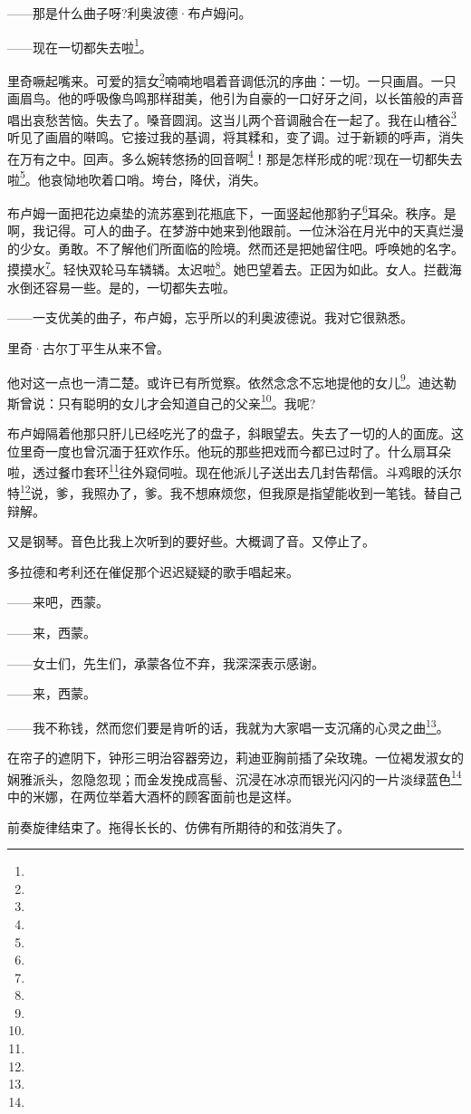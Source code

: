 \par ——那是什么曲子呀?利奥波德·布卢姆问。
\par ——现在一切都失去啦\footnote{}。
\par 里奇噘起嘴来。可爱的狺女\footnote{}喃喃地唱着音调低沉的序曲：一切。一只画眉。一只画眉鸟。他的呼吸像鸟鸣那样甜美，他引为自豪的一口好牙之间，以长笛般的声音唱出哀愁苦恼。失去了。嗓音圆润。这当儿两个音调融合在一起了。我在山楂谷\footnote{}听见了画眉的啭鸣。它接过我的基调，将其糅和，变了调。过于新颖的呼声，消失在万有之中。回声。多么婉转悠扬的回音啊\footnote{}！那是怎样形成的呢?现在一切都失去啦\footnote{}。他哀恸地吹着口哨。垮台，降伏，消失。
\par 布卢姆一面把花边桌垫的流苏塞到花瓶底下，一面竖起他那豹子\footnote{}耳朵。秩序。是啊，我记得。可人的曲子。在梦游中她来到他跟前。一位沐浴在月光中的天真烂漫的少女。勇敢。不了解他们所面临的险境。然而还是把她留住吧。呼唤她的名字。摸摸水\footnote{}。轻快双轮马车辚辚。太迟啦\footnote{}。她巴望着去。正因为如此。女人。拦截海水倒还容易一些。是的，一切都失去啦。
\par ——一支优美的曲子，布卢姆，忘乎所以的利奥波德说。我对它很熟悉。
\par 里奇·古尔丁平生从来不曾。
\par 他对这一点也一清二楚。或许已有所觉察。依然念念不忘地提他的女儿\footnote{}。迪达勒斯曾说：只有聪明的女儿才会知道自己的父亲\footnote{}。我呢?
\par 布卢姆隔着他那只肝儿已经吃光了的盘子，斜眼望去。失去了一切的人的面庞。这位里奇一度也曾沉湎于狂欢作乐。他玩的那些把戏而今都已过时了。什么扇耳朵啦，透过餐巾套环\footnote{}往外窥伺啦。现在他派儿子送出去几封告帮信。斗鸡眼的沃尔特\footnote{}说，爹，我照办了，爹。我不想麻烦您，但我原是指望能收到一笔钱。替自己辩解。
\par 又是钢琴。音色比我上次听到的要好些。大概调了音。又停止了。
\par 多拉德和考利还在催促那个迟迟疑疑的歌手唱起来。
\par ——来吧，西蒙。
\par ——来，西蒙。
\par ——女士们，先生们，承蒙各位不弃，我深深表示感谢。
\par ——来，西蒙。
\par ——我不称钱，然而您们要是肯听的话，我就为大家唱一支沉痛的心灵之曲\footnote{}。
\par 在帘子的遮阴下，钟形三明治容器旁边，莉迪亚胸前插了朵玫瑰。一位褐发淑女的娴雅派头，忽隐忽现；而金发挽成高髻、沉浸在冰凉而银光闪闪的一片淡绿蓝色\footnote{}中的米娜，在两位举着大酒杯的顾客面前也是这样。
\par 前奏旋律结束了。拖得长长的、仿佛有所期待的和弦消失了。
